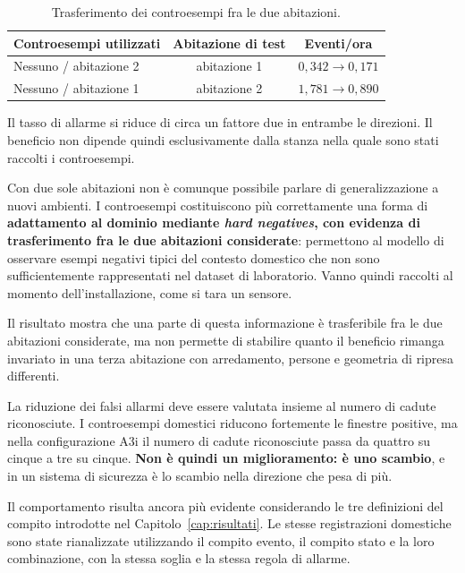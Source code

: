 \begin{table}[ht]
\centering
\caption{Trasferimento dei controesempi fra le due abitazioni.}
\label{tab:controesempi_cross}
\begin{tabular}{lcc}
\toprule
\textbf{Controesempi utilizzati} &
\textbf{Abitazione di test} &
\textbf{Eventi/ora} \\
\midrule
Nessuno / abitazione 2 & abitazione 1 & $0{,}342 \rightarrow 0{,}171$ \\
Nessuno / abitazione 1 & abitazione 2 & $1{,}781 \rightarrow 0{,}890$ \\
\bottomrule
\end{tabular}
\end{table}

Il tasso di allarme si riduce di circa un fattore due in entrambe le direzioni. Il beneficio non dipende quindi esclusivamente dalla stanza nella quale sono stati raccolti i controesempi.

Con due sole abitazioni non è comunque possibile parlare di generalizzazione a nuovi ambienti. I controesempi costituiscono più correttamente una forma di \textbf{adattamento al dominio mediante \emph{hard negatives}, con evidenza di trasferimento fra le due abitazioni considerate}: permettono al modello di osservare esempi negativi tipici del contesto domestico che non sono sufficientemente rappresentati nel dataset di laboratorio. Vanno quindi raccolti al momento dell'installazione, come si tara un sensore.

Il risultato mostra che una parte di questa informazione è trasferibile fra le due abitazioni considerate, ma non permette di stabilire quanto il beneficio rimanga invariato in una terza abitazione con arredamento, persone e geometria di ripresa differenti.

La riduzione dei falsi allarmi deve essere valutata insieme al numero di cadute riconosciute. I controesempi domestici riducono fortemente le finestre positive, ma nella configurazione A3i il numero di cadute riconosciute passa da quattro su cinque a tre su cinque. \textbf{Non è quindi un miglioramento: è uno scambio}, e in un sistema di sicurezza è lo scambio nella direzione che pesa di più.

Il comportamento risulta ancora più evidente considerando le tre definizioni del compito introdotte nel Capitolo~\ref{cap:risultati}. Le stesse registrazioni domestiche sono state rianalizzate utilizzando il compito evento, il compito stato e la loro combinazione, con la stessa soglia e la stessa regola di allarme.

